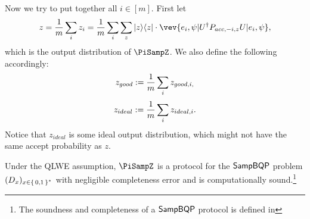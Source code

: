 Now we try to put together all $i\in [m]$. First let
$$z=\frac{1}{m} \sum_i z_i= \frac{1}{m} \sum_i \sum_z \proj{z} \cdot \vev{e_i,\psi|U^\dag P_{acc,-i,z} U|e_i,\psi},$$
which is the output distribution of $\PiSampZ$.
We also define the following accordingly:
$$z_{good}:= \frac{1}{m}\sum_i z_{good,i,}$$
$$z_{ideal}:= \frac{1}{m}\sum_i z_{ideal,i}.$$
Notice that $z_{ideal}$ is some ideal output distribution, which might not have the same accept probability as $z$.




\begin{theorem}\label{thm:qpip0} 
	Under the QLWE assumption, $\PiSampZ$ is a protocol for the $\operatorname{\mathsf{SampBQP}}$ problem $(D_x)_{x\in\set{0,1}^*}$  with negligible completeness error and is computationally sound.\footnote{The soundness and completeness of a $\operatorname{\mathsf{SampBQP}}$ protocol is defined in }
	
	
\end{theorem}
